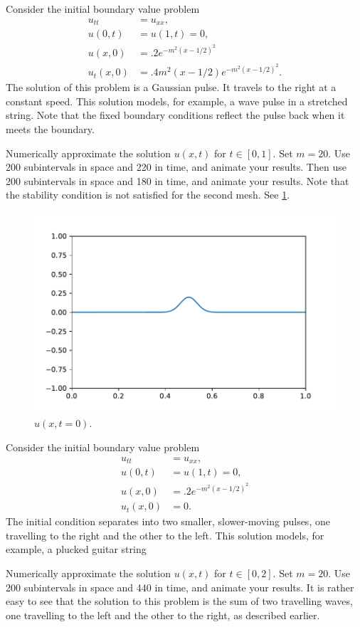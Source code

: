 \begin{problem}
\label{prob:prob2}
Consider the initial boundary value problem
\begin{align*}
	u_{tt} &= u_{xx}, \\
	u(0,t) &= u(1,t) = 0, \\
	u(x,0) &= .2e^{-m^2(x-1/2)^2}\\
	u_t(x,0) &= .4m^2(x-1/2)e^{-m^2(x-1/2)^2}.
\end{align*}
The solution of this problem is a Gaussian pulse.
It travels to the right at a constant speed.
This solution models, for example, a wave pulse in a stretched string.
Note that the fixed boundary conditions reflect the pulse back when it meets the boundary.

Numerically approximate the solution $u(x,t)$ for $t \in \left[0, 1\right]$.
Set $m=20$.
Use 200 subintervals in space and 220 in time, and animate your results.
Then use 200 subintervals in space and 180 in time, and animate your results.
Note that the stability condition is not satisfied for the second mesh.
See \ref{fig:prob2}.

\begin{figure}[H]
\centering
\includegraphics[width=\textwidth]{prob2.pdf}
\caption{$u(x,t=0)$.}
\label{fig:prob2}
\end{figure}
\end{problem}

\begin{problem}
\label{prob:prob3}
Consider the initial boundary value problem
\begin{align*}
	u_{tt} &= u_{xx}, \\
	u(0,t) &= u(1,t) = 0, \\
	u(x,0) &= .2e^{-m^2(x-1/2)^2}\\
	u_t(x,0) &= 0.
\end{align*}
The initial condition separates into two smaller, slower-moving pulses, one travelling to the right and the other to the left.
This solution models, for example, a plucked guitar string

Numerically approximate the solution $u(x,t)$ for $t \in \left[0,2\right]$.
Set $m=20$.
Use 200 subintervals in space and 440 in time, and animate your results.
It is rather easy to see that the solution to this problem is the sum of two travelling waves, one travelling to the left and the other to the right, as described earlier.
\end{problem}

